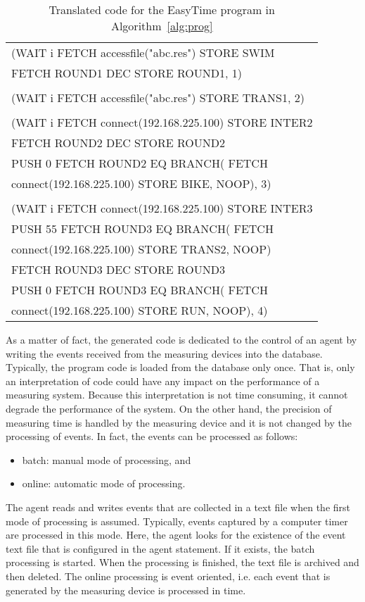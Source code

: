 \documentclass[preprint, prX]{revtex4}
\begin{document}
\begin{table}[htb]
\caption{Translated code for the EasyTime program in Algorithm~\ref{alg:prog}}
\label{tab:tab10}
\begin{center}
\small
\begin{tabular}{ | l | }
\hline

(WAIT i FETCH accessfile("abc.res") STORE SWIM \\
FETCH ROUND1 DEC STORE ROUND1, 1) \\ \\
(WAIT i FETCH accessfile("abc.res") STORE TRANS1, 2) \\ \\
(WAIT i FETCH connect(192.168.225.100) STORE INTER2 \\
FETCH ROUND2 DEC STORE ROUND2 \\
PUSH 0  FETCH ROUND2  EQ BRANCH( FETCH \\
connect(192.168.225.100) STORE BIKE, NOOP), 3) \\ \\
(WAIT i FETCH connect(192.168.225.100) STORE INTER3 \\
PUSH 55  FETCH ROUND3  EQ BRANCH( FETCH \\
connect(192.168.225.100) STORE TRANS2, NOOP) \\
FETCH ROUND3 DEC STORE ROUND3 \\
PUSH 0  FETCH ROUND3  EQ BRANCH( FETCH \\
connect(192.168.225.100) STORE RUN, NOOP), 4) \\

\hline
\end{tabular}
\normalsize
\end{center}
\end{table}


As a matter of fact, the generated code is dedicated to the control of an agent by writing the events received from the measuring
devices into the database. Typically, the program code is loaded from the database only once. That is, only an
interpretation of code could have any impact on the performance of a measuring system. Because this interpretation is not time consuming, it cannot degrade the performance of the system. On the other hand, the precision of measuring time is handled by the measuring device and it is not changed by the processing of events. In fact, the events can be processed as follows:
\begin{itemize}
  \item batch: manual mode of processing, and
  \item online: automatic mode of processing.
\end{itemize}
The agent reads and writes events that are collected in a text file when the first mode of processing is assumed. Typically, events
captured by a computer timer are processed in this mode. Here, the agent looks for the existence of the event text file that is
configured in the agent statement. If it exists, the batch processing is started. When the processing is finished, the text file is
archived and then deleted. The online processing is event oriented, i.e. each event that is generated by the measuring device is
processed in time.
\end{document}
